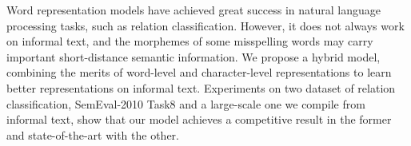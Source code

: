 Word representation models have achieved great success in natural language processing tasks, such as relation classification. However, it does not always work on informal text, and the morphemes of some misspelling  words may carry important short-distance semantic information. We propose a hybrid model, combining the merits of word-level and character-level representations to learn better representations on informal text. Experiments on two dataset of relation classification, SemEval-2010 Task8 and a large-scale one we compile from informal text, show that our model achieves a competitive result in the former and state-of-the-art with the other.
